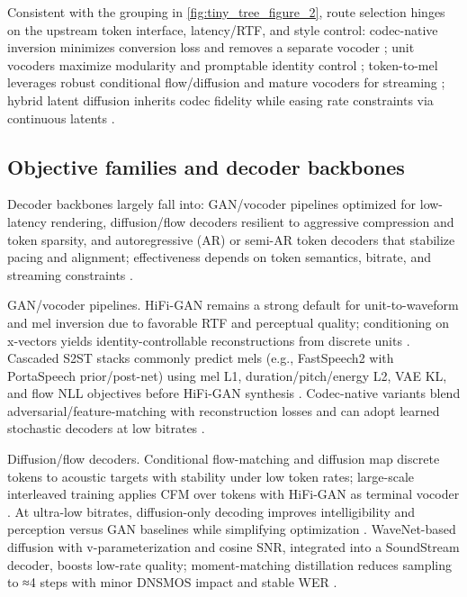 \documentclass{article}
\begin{document}
Consistent with the grouping in \autoref{fig:tiny_tree_figure_2}, route selection hinges on the upstream token interface, latency/RTF, and style control: codec-native inversion minimizes conversion loss and removes a separate vocoder \cite{peng2024mslms2stmultitaskspeechlanguagemodeltext}; unit vocoders maximize modularity and promptable identity control \cite{ma2024languagemodelcanlistenwhilespeaking}; token-to-mel leverages robust conditional flow/diffusion and mature vocoders for streaming \cite{zeng2024scalingspeechtextpretrainingsyntheticint,wang2025tadicodectextawarediffusionspeechtokeniz}; hybrid latent diffusion inherits codec fidelity while easing rate constraints via continuous latents \cite{yang2025diffsoundstreamefficientspeechtokenizati}.

\subsection{Objective families and decoder backbones} \label{subsec:Objective families and decoder backbones}
Decoder backbones largely fall into: GAN/vocoder pipelines optimized for low-latency rendering, diffusion/flow decoders resilient to aggressive compression and token sparsity, and autoregressive (AR) or semi-AR token decoders that stabilize pacing and alignment; effectiveness depends on token semantics, bitrate, and streaming constraints \cite{li2024investigatingneuralaudiocodecsspeechlang,shen2024acousticbpespeechgenerationdiscretetoken,zhang2024speechtokenizerunifiedspeechtokenizerlar,yang2025diffsoundstreamefficientspeechtokenizati}.

GAN/vocoder pipelines. HiFi-GAN remains a strong default for unit-to-waveform and mel inversion due to favorable RTF and perceptual quality; conditioning on x-vectors yields identity-controllable reconstructions from discrete units \cite{nakata2024jchatjapaneselargescalespokendialoguecor}. Cascaded S2ST stacks commonly predict mels (e.g., FastSpeech2 with PortaSpeech prior/post-net) using mel L1, duration/pitch/energy L2, VAE KL, and flow NLL objectives before HiFi-GAN synthesis \cite{huang2023holisticcascadesystembenchmarkhumanevalu}. Codec-native variants blend adversarial/feature-matching with reconstruction losses and can adopt learned stochastic decoders at low bitrates \cite{yang2025diffsoundstreamefficientspeechtokenizati}.

Diffusion/flow decoders. Conditional flow-matching and diffusion map discrete tokens to acoustic targets with stability under low token rates; large-scale interleaved training applies CFM over tokens with HiFi-GAN as terminal vocoder \cite{zeng2024scalingspeechtextpretrainingsyntheticint}. At ultra-low bitrates, diffusion-only decoding improves intelligibility and perception versus GAN baselines while simplifying optimization \cite{wang2025tadicodectextawarediffusionspeechtokeniz}. WaveNet-based diffusion with v-parameterization and cosine SNR, integrated into a SoundStream decoder, boosts low-rate quality; moment-matching distillation reduces sampling to ≈4 steps with minor DNSMOS impact and stable WER \cite{yang2025diffsoundstreamefficientspeechtokenizati}.
\end{document}
